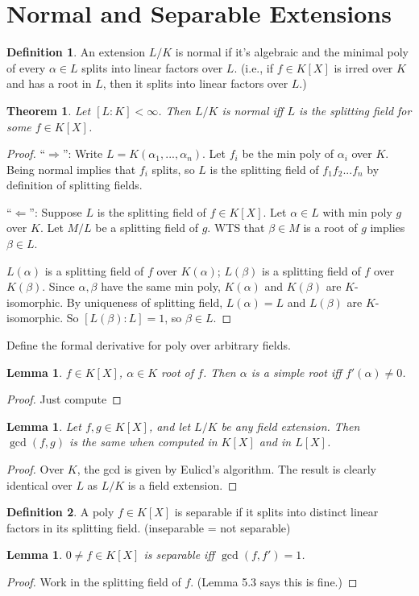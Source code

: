 \documentclass{article}
\theoremstyle{definition}
\newtheorem*{defn*}{Definition}
\theoremstyle{remark}
\theoremstyle{plain}
\newtheorem{lem}[defn]{Lemma}
\newtheorem{thm}[defn]{Theorem}
\begin{document}
\section{Normal and Separable Extensions}
\begin{defn*}
An extension $L/K$ is normal if it's algebraic and the minimal poly of every $\alpha\in L$ splits into linear factors over $L$. (i.e., if $f\in K[X]$ is irred over $K$ and has a root in $L$, then it splits into linear factors over $L$.)
\end{defn*}
\begin{thm}
Let $[L:K]<\infty$. Then $L/K$ is normal iff $L$ is the splitting field for some $f\in K[X]$.
\end{thm}
\begin{proof}
``$\Rightarrow$'': Write $L=K(\alpha_1,...,\alpha_n)$. Let $f_i$ be the min poly of $\alpha_i$ over $K$. Being normal implies that $f_i$ splits, so $L$ is the splitting field of $f_1f_2...f_n$ by definition of splitting fields.

``$\Leftarrow$'': Suppose $L$ is the splitting field of $f\in K[X]$. Let $\alpha\in L$ with min poly $g$ over $K$. Let $M/L$ be a splitting field of $g$. WTS that $\beta\in M$ is a root of $g$ implies $\beta\in L$.

$L(\alpha)$ is a splitting field of $f$ over $K(\alpha)$; $L(\beta)$ is a splitting field of $f$ over $K(\beta)$. Since $\alpha,\beta$ have the same min poly, $K(\alpha)$ and $K(\beta)$ are $K$-isomorphic. By uniqueness of splitting field, $L(\alpha)=L$ and $L(\beta)$ are $K$-isomorphic. So $[L(\beta):L]=1$, so $\beta\in L$.
\end{proof}

Define the formal derivative for poly over arbitrary fields.

\begin{lem}
    $f\in K[X]$, $\alpha\in K$ root of $f$. Then $\alpha$ is a simple root iff $f'(\alpha)\neq 0$.
\end{lem}
\begin{proof}Just compute
\end{proof}

\begin{lem}
    Let $f,g\in K[X]$, and let $L/K$ be any field extension. Then $\gcd(f,g)$ is the same when computed in $K[X]$ and in $L[X]$.
\end{lem}
\begin{proof}
    Over $K$, the gcd is given by Eulicd's algorithm. The result is clearly identical over $L$ as $L/K$ is a field extension.
\end{proof}
\begin{defn*}
    A poly $f\in K[X]$ is separable if it splits into distinct linear factors in its splitting field. (inseparable = not separable)
\end{defn*}
\begin{lem}
    $0\neq f\in K[X]$ is separable iff $\gcd(f,f')=1$.
\end{lem}
\begin{proof}Work in the splitting field of $f$. (Lemma 5.3 says this is fine.)
\end{proof}
\end{document}
